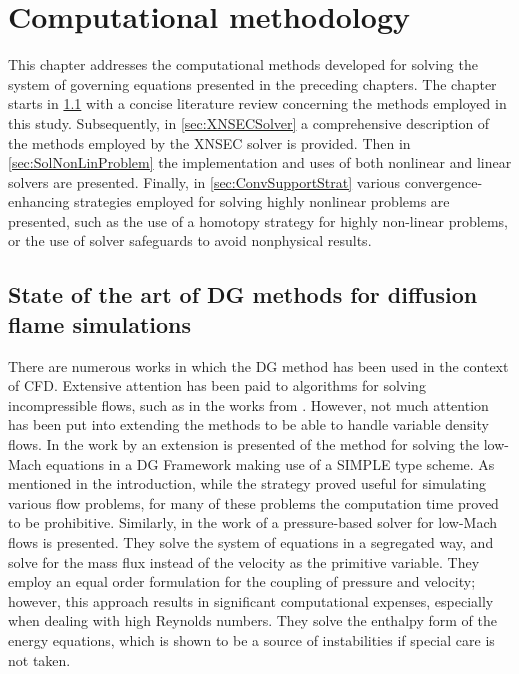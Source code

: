 \chapter{Computational methodology} \label{ch:CompMethodology}
This chapter addresses the computational methods developed for solving the system of governing equations presented in the preceding chapters. The chapter starts in \cref{sec:StateOFArt} with a concise literature review concerning the methods employed in this study. Subsequently, in \cref{sec:XNSECSolver} a comprehensive description of the methods employed by the XNSEC solver is provided. Then in \cref{sec:SolNonLinProblem} the implementation and uses of both nonlinear and linear solvers are presented. Finally, in \cref{sec:ConvSupportStrat} various convergence-enhancing strategies employed for solving highly nonlinear problems are presented, such as the use of a homotopy strategy for highly non-linear problems, or the use of solver safeguards to avoid nonphysical results. 

\section{State of the art of DG methods for diffusion flame simulations} \label{sec:StateOFArt}
There are numerous works in which the \Gls{DG} method has been used in the context of \Gls{CFD}. Extensive attention has been paid to algorithms for solving incompressible flows, such as in the works from  \textcite{shahbaziHighorderDiscontinuousGalerkin2007,kummerBoSSSDiscontinuousGalerkin2012,kleinSIMPLEBasedDiscontinuous2013}. However, not much attention has been put into extending the methods to be able to handle variable density flows. In the work by \textcite{kleinHighorderDiscontinuousGalerkin2016} an extension is presented of the method for solving  the low-Mach equations in a DG Framework making use of a SIMPLE type scheme. As mentioned in the introduction, while the strategy proved useful for simulating various flow problems, for many of these problems the computation time proved to be prohibitive. Similarly, in the work of  \textcite{henninkPressurebasedSolverLowMach2021} a pressure-based solver for low-Mach flows is presented. They solve the system of equations in a segregated way, and solve for the mass flux instead of the velocity as the primitive variable. They employ an equal order formulation for the coupling of pressure and velocity; however, this approach results in significant computational expenses, especially when dealing with high Reynolds numbers. They solve the enthalpy form of the energy equations, which is shown to be a source of instabilities if special care is not taken. 


